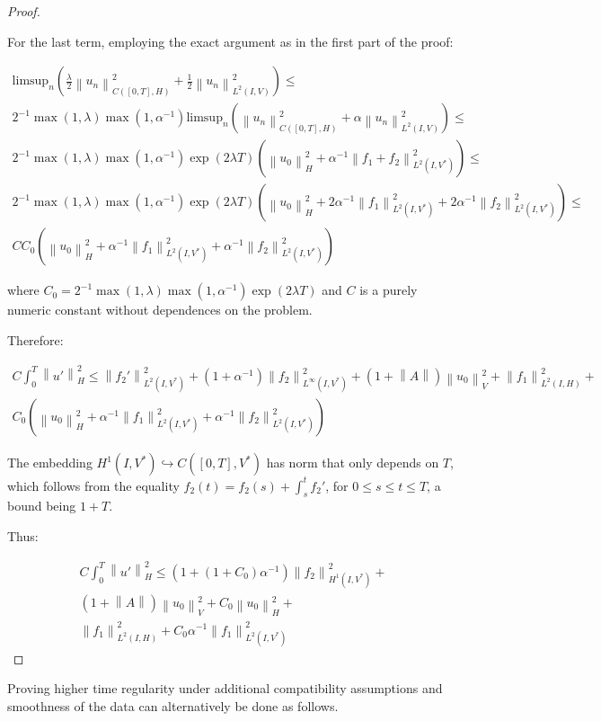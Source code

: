 \documentclass[english,a4paper,10pt,oneside]{scrbook}	%
\theoremstyle{break}
\newenvironment{mproof}[1][\proofname]{%
  \begin{proof}[#1]$ $\par\nobreak\ignorespaces
}{%
  \end{proof}
}
\renewcommand*{\proofname}{Proof}
\theoremstyle{remark}
\newcommand{\ds}{\displaystyle}
\newcommand{\norm}[1]{\left\lVert#1\right\rVert}
\newcommand{\HN}[1]{\norm{#1}_{H}}
\newcommand{\VN}[1]{\norm{#1}_{V}}
\newcommand{\emb}{\hookrightarrow}
\begin{document}
\begin{mproof}
For the last term, employing the exact argument as in the first part of the proof:

\begin{align}
\label{eqn:limsup}
\text{limsup}_n \left ( \frac{\lambda}{2}\norm{u_n}_{C([0,T],H)}^2 + \frac{1}{2}\norm{u_n}_{L^2(I,V)}^2 \right )\leq\\
2^{-1}\max(1,\lambda)\max(1,\alpha^{-1}) \text{limsup}_n \left ( \norm{u_n}_{C([0,T],H)}^2 + {\alpha}\norm{u_n}_{L^2(I,V)}^2 \right )\leq\\
2^{-1}\max(1,\lambda)\max(1,\alpha^{-1})\exp(2\lambda T)(\HN{u_0}^2+\alpha^{-1}\norm{f_1+f_2}^2_{L^2(I,V^*)}) \leq \\
2^{-1}\max(1,\lambda)\max(1,\alpha^{-1})\exp(2\lambda T)(\HN{u_0}^2+2\alpha^{-1}\norm{f_1}^2_{L^2(I,V^*)}+2\alpha^{-1}\norm{f_2}^2_{L^2(I,V^*)}) \leq \\
C C_0(\HN{u_0}^2+\alpha^{-1}\norm{f_1}^2_{L^2(I,V^*)}+\alpha^{-1}\norm{f_2}^2_{L^2(I,V^*)})
\end{align}


where $C_0 = \ds 2^{-1}\max(1,\lambda)\max(1,\alpha^{-1})\exp(2\lambda T)$ and $C$ is a purely numeric constant without dependences on the problem.

Therefore:

\begin{align*}
C\int_0^T\HN{u'}^2\leq 
\norm{f_2'}_{L^2(I,V^*)}^2+(1+\alpha^{-1})\norm{f_2}_{L^\infty(I,V^*)}^2+(1+\norm{A})\VN{u_{0}}^2+\norm{f_1}_{L^2(I,H)}^2+\\
C_0(\HN{u_0}^2+\alpha^{-1}\norm{f_1}^2_{L^2(I,V^*)}+\alpha^{-1}\norm{f_2}^2_{L^2(I,V^*)})
\end{align*}


The embedding $H^1(I,V^*)\emb C([0,T],V^*)$ has norm that only depends on $T$, which follows from the equality $f_2(t)=f_2(s)+\int_s^tf_2'$, for $0\leq s \leq t \leq T$, a bound being $1+T$.

Thus:

\begin{align*}
C\int_0^T\HN{u'}^2\leq 
(1+(1+C_0)\alpha^{-1})\norm{f_2}_{H^1(I,V^*)}^2+\\
(1+\norm{A})\VN{u_{0}}^2+C_0\HN{u_0}^2+\\
\norm{f_1}_{L^2(I,H)}^2+C_0\alpha^{-1}\norm{f_1}^2_{L^2(I,V^*)}
\end{align*}


\end{mproof}


Proving higher time regularity under additional compatibility assumptions and smoothness of the data can alternatively be done as follows.
\end{document}
